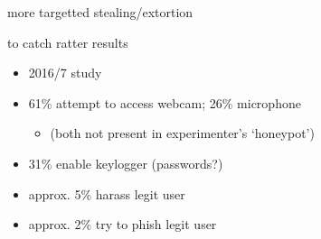 \begin{frame}{more targetted stealing/extortion}
\end{frame}


{
    \begin{frame}[plain]
    \end{frame}
}

\begin{frame}{to catch ratter results}
    \begin{itemize}
    \item 2016/7 study
    \item 61\% attempt to access webcam; 26\% microphone
        \begin{itemize}
        \item (both not present in experimenter's `honeypot')
        \end{itemize}
    \item 31\% enable keylogger (passwords?)
    \item approx. 5\% harass legit user
    \item approx. 2\% try to phish legit user
    \end{itemize}
\end{frame}

